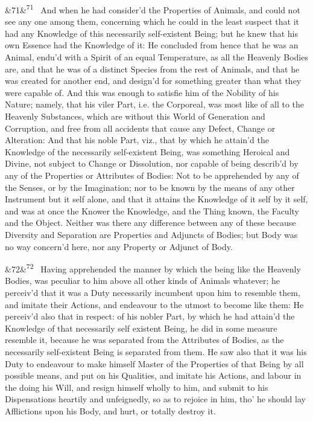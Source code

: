 \documentclass[12pt]{article}
\newcommand{\para}[1][]{\par\noindent\ifx&#1&\else\textsuperscript{\footnotesize #1}~\fi}
\begin{document}
\para[71] And when he had consider'd the Properties of Animals, and could not see any one among them, concerning which he could in the least suspect that it had any Knowledge of this necessarily self-existent Being; but he knew that his own Essence had the Knowledge of it: He concluded from hence that he was an Animal, endu'd with a Spirit of an equal Temperature, as all the Heavenly Bodies are, and that he was of a distinct Species from the rest of Animals, and that he was created for another end, and design'd for something greater than what they were capable of. And this was enough to satisfie him of the Nobility of his Nature; namely, that his viler Part, i.e. the Corporeal, was most like of all to the Heavenly Substances, which are without this World of Generation and Corruption, and free from all accidents that cause any Defect, Change or Alteration: And that his noble Part, viz., that by which he attain'd the Knowledge of the necessarily self-existent Being, was something Heroical and Divine, not subject to Change or Dissolution, nor capable of being describ'd by any of the Properties or Attributes of Bodies: Not to be apprehended by any of the Senses, or by the Imagination; nor to be known by the means of any other Instrument but it self alone, and that it attains the Knowledge of it self by it self, and was at once the Knower the Knowledge, and the Thing known, the Faculty and the Object. Neither was there any difference between any of these because Diversity and Separation are Properties and Adjuncts of Bodies; but Body was no way concern'd here, nor any Property or Adjunct of Body.

\para[72] Having apprehended the manner by which the being like the Heavenly Bodies, was peculiar to him above all other kinds of Animals whatever; he perceiv'd that it was a Duty necessarily incumbent upon him to resemble them, and imitate their Actions, and endeavour to the utmost to become like them: He perceiv'd also that in respect: of his nobler Part, by which he had attain'd the Knowledge of that necessarily self existent Being, he did in some measure resemble it, because he was separated from the Attributes of Bodies, as the necessarily self-existent Being is separated from them. He saw also that it was his Duty to endeavour to make himself Master of the Properties of that Being by all possible means, and put on his Qualities, and imitate his Actions, and labour in the doing his Will, and resign himself wholly to him, and submit to his Dispensations heartily and unfeignedly, so as to rejoice in him, tho' he should lay Afflictions upon his Body, and hurt, or totally destroy it.
\end{document}
